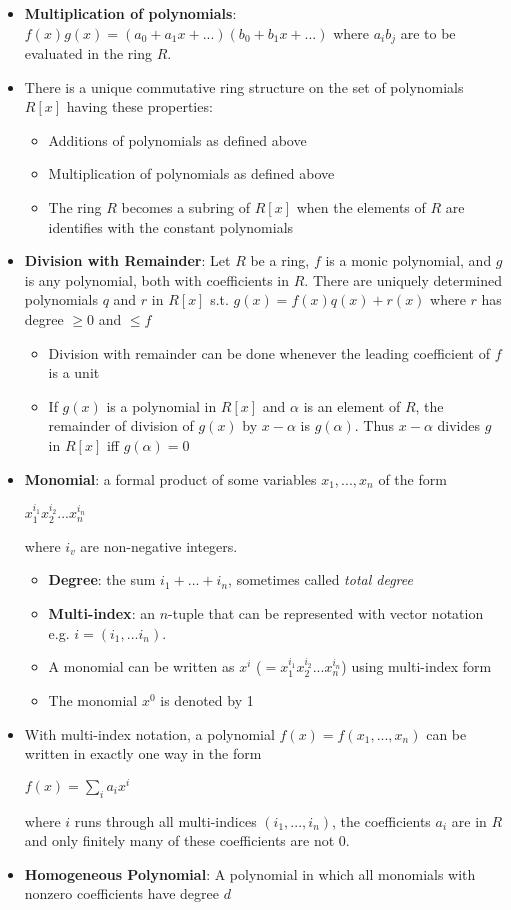 \documentclass[12pt]{article}
\begin{document}
\begin{itemize}
  \item \textbf{Multiplication of polynomials}: $f(x)g(x) = (a_0 + a_1x + ...)(b_0 + b_1x + ...)$ where $a_ib_j$ are to be evaluated in the ring $R$.
  \item There is a unique commutative ring structure on the set of polynomials $R[x]$ having these properties:
  \begin{itemize}
    \item Additions of polynomials as defined above
    \item Multiplication of polynomials as defined above
    \item The ring $R$ becomes a subring of $R[x]$ when the elements of $R$ are identifies with the constant polynomials
  \end{itemize}
  \item \textbf{Division with Remainder}: Let $R$ be a ring, $f$ is a monic polynomial, and $g$ is any polynomial, both with coefficients in $R$. There are uniquely determined polynomials $q$ and $r$ in $R[x]$ s.t. $g(x) = f(x)q(x) + r(x)$ where $r$ has degree $\geqslant 0$ and $\leqslant f$
  \begin{itemize}
    \item Division with remainder can be done whenever the leading coefficient of $f$ is a unit
    \item If $g(x)$ is a polynomial in $R[x]$ and $\alpha$ is an element of $R$, the remainder of division of $g(x)$ by $x - \alpha$ is $g(\alpha)$. Thus $x - \alpha$ divides $g$ in $R[x]$ iff $g(\alpha) = 0$
  \end{itemize}
  \item \textbf{Monomial}: a formal product of some variables $x_1, ..., x_n$ of the form
  \begin{center}
    $x_1^{i_1}x_2^{i_2}...x_n^{i_n}$
  \end{center}
  where $i_v$ are non-negative integers.
  \begin{itemize}
    \item \textbf{Degree}: the sum $i_1 + ... + i_n$, sometimes called \textit{total degree}
    \item \textbf{Multi-index}: an $n$-tuple that can be represented with vector notation e.g.  $i = (i_1, ... i_n)$.
    \item A monomial can be written as $x^i$ ($= x_1^{i_1}x_2^{i_2} ... x_n^{i_n}$) using multi-index form
    \item The monomial $x^0$ is denoted by 1
  \end{itemize}
  \item With multi-index notation, a polynomial $f(x) = f(x_1, ..., x_n)$ can be written in exactly one way in the form
  \begin{center}
    $f(x) = \sum\limits_ia_ix^i$
  \end{center}
  where $i$ runs through all multi-indices $(i_1, ..., i_n)$, the coefficients $a_i$ are in $R$ and only finitely many of these coefficients are not 0.
  \item \textbf{Homogeneous Polynomial}: A polynomial in which all monomials with nonzero coefficients have degree $d$
\end{itemize}
\end{document}
